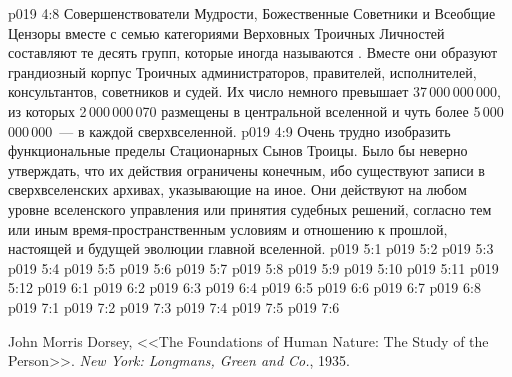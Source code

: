 \vs p019 4:8 \pc Совершенствователи Мудрости, Божественные Советники и Всеобщие Цензоры вместе с семью категориями Верховных Троичных Личностей составляют те десять групп, которые иногда называются . Вместе они образуют грандиозный корпус Троичных администраторов, правителей, исполнителей, консультантов, советников и судей. Их число немного превышает 37\,000\,000\,000, из которых 2\,000\,000\,070 размещены в центральной вселенной и чуть более 5\,000\,000\,000~--- в каждой сверхвселенной.
\vs p019 4:9 Очень трудно изобразить функциональные пределы Стационарных Сынов Троицы. Было бы неверно утверждать, что их действия ограничены конечным, ибо существуют записи в сверхвселенских архивах, указывающие на иное. Они действуют на любом уровне вселенского управления или принятия судебных решений, согласно тем или иным время\hyp{}пространственным условиям и отношению к прошлой, настоящей и будущей эволюции главной вселенной.
\vs p019 5:1 
\vs p019 5:2 
\vs p019 5:3 
\vs p019 5:4 
\vs p019 5:5 \pc 
\vs p019 5:6 
\vs p019 5:7 
\vs p019 5:8 \pc 
\vs p019 5:9 
\vs p019 5:10 
\vs p019 5:11 
\vs p019 5:12 
\vs p019 6:1 
\vs p019 6:2 
\vs p019 6:3 \pc 
\vs p019 6:4 \pc 
\vs p019 6:5 
\vs p019 6:6 
\vs p019 6:7 
\vs p019 6:8 
\vs p019 7:1 
\vs p019 7:2 \pc 
\vs p019 7:3 \pc 
\vs p019 7:4 
\vs p019 7:5 
\vsetoff
\vs p019 7:6 
\quizlink
\begin{thebibliography}{100}
John Morris Dorsey,
{<<The Foundations of Human Nature: The Study of the Person>>.}
{\em New York: Longmans, Green and Co.}, 1935.
\end{thebibliography}
